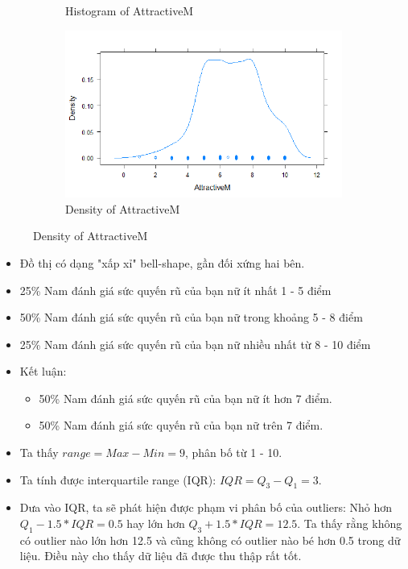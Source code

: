 \documentclass[a4paper,12pt]{article}
\begin{document}
\begin{enumerate}[label = {\alph*)}]
\begin{itemize}
\begin{figure}[H]
\begin{subfigure}[b]{0.4\linewidth}
							\caption{Histogram of AttractiveM}
						\end{subfigure}
						\begin{subfigure}[b]{0.4\linewidth}
							\includegraphics[width=\linewidth]{Images/denplot1}
							\caption{Density of AttractiveM}
						\end{subfigure}
						\label{fig:rplot2}
					\end{figure}
					
					
					\begin{itemize}
						\item Đồ thị có dạng "xấp xỉ" bell-shape, gần đối xứng hai bên.
						\item 25\% Nam đánh giá sức quyến rũ của bạn nữ ít nhất 1 - 5 điểm
						\item 50\% Nam đánh giá sức quyến rũ của bạn nữ trong khoảng 5 - 8 điểm
						\item 25\% Nam đánh giá sức quyến rũ của bạn nữ nhiều nhất từ 8 - 10 điểm
						\item Kết luận:
						\begin{itemize}
							\item 50\% Nam đánh giá sức quyến rũ của bạn nữ ít hơn 7 điểm.
							\item 50\% Nam đánh giá sức quyến rũ của bạn nữ trên 7 điểm.
						\end{itemize}
						\item Ta thấy $range = Max - Min = 9$, phân bố từ 1 - 10.
						\item Ta tính được interquartile range (IQR): $IQR = Q_3 - Q_1 = 3$.
						\item Dưa vào IQR, ta sẽ phát hiện được phạm vi phân bố của outliers:
						Nhỏ hơn $Q_1 - 1.5*IQR = 0.5$ hay lớn hơn $Q_3 + 1.5*IQR = 12.5$. Ta thấy rằng không có outlier nào lớn hơn 12.5 và cũng không có outlier nào bé hơn 0.5 trong dữ liệu.  Điều này cho thấy dữ liệu đã được thu thập rất tốt. 
					\end{itemize}
					

\end{itemize}
\end{enumerate}
\end{document}
